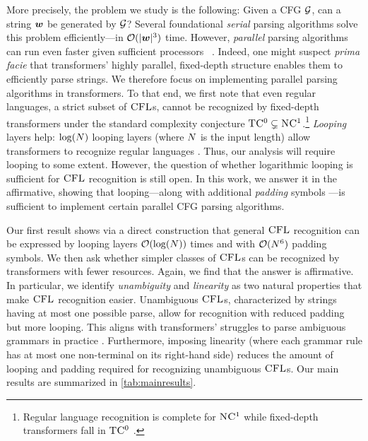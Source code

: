 \documentclass{article}
\begin{document}
More precisely, the problem we study is the following: Given a CFG ${{ \mathcal{G}}}$, can a string ${{\boldsymbol{w}}}$ be generated by ${{ \mathcal{G}}}$? 
Several foundational \emph{serial} parsing algorithms \citep{earley-parsing, cocke, kasami1965AnER, younger} solve this problem efficiently---in ${{ \mathcal{O}}}(|{{\boldsymbol{w}}}|^3)$ time.
However, \emph{parallel} parsing algorithms can run even faster given sufficient processors ~\citep{ruzzo-treesize, rytter-parallelunambiguous, lange-parallel}.
Indeed, one might suspect \textit{prima facie} that transformers' highly parallel, fixed-depth structure \citep{merrill-sabharwal-2023-parallelism} enables them to efficiently parse strings.
We therefore focus on implementing parallel parsing algorithms in transformers.
To that end, we first note that even regular languages, a strict subset of ${\textsc{CFL}}$s, cannot be recognized by fixed-depth transformers under the standard complexity conjecture ${\textsc{TC}\textsuperscript{0}} \subsetneq {\textsc{NC}\textsuperscript{1}}$.\footnote{Regular language recognition is complete for ${\textsc{NC}\textsuperscript{1}}$ \citep{barrington_monoids} while fixed-depth transformers fall in ${\textsc{TC}\textsuperscript{0}}$ \citep{merrill-etal-2022-saturated, chiang2025transformersuniformtc0}.} 
\emph{Looping} layers help: $\log({{ N}})$ looping layers (where ${{ N}}$ is the input length) allow transformers to recognize regular languages \citep{merrill-2025littledepthgoeslong}.
Thus, our analysis will require looping to some extent.
However, the question of whether logarithmic looping is sufficient for ${\textsc{CFL}}$ recognition is still open.
In this work, we answer it in the affirmative, showing that looping---along with additional \emph{padding} symbols \citep{merrill2025exactexpressivepowertransformers}---is sufficient to implement certain parallel CFG parsing algorithms.

Our first result shows via a direct construction that general ${\textsc{CFL}}$ recognition can be expressed by looping layers ${{ \mathcal{O}}}(\log({{ N}}))$ times and with ${{ \mathcal{O}}}({{ N}}^6)$ padding symbols.
We then ask whether simpler classes of ${\textsc{CFL}}$s can be recognized by transformers with fewer resources.
Again, we find that the answer is affirmative.
In particular, we identify \emph{unambiguity} and \emph{linearity} as two natural properties that make ${\textsc{CFL}}$ recognition easier. 
Unambiguous ${\textsc{CFL}}$s, characterized by strings having at most one possible parse, allow for recognition with reduced padding but more looping. 
This aligns with transformers' struggles to parse ambiguous grammars in practice \citep{khalighinejad-etal-2023-approximating}. 
Furthermore, imposing linearity (where each grammar rule has at most one non-terminal on its right-hand side) reduces the amount of looping and padding required for recognizing unambiguous ${\textsc{CFL}}$s. 
Our main results are summarized in \cref{tab:mainresults}.
\end{document}
